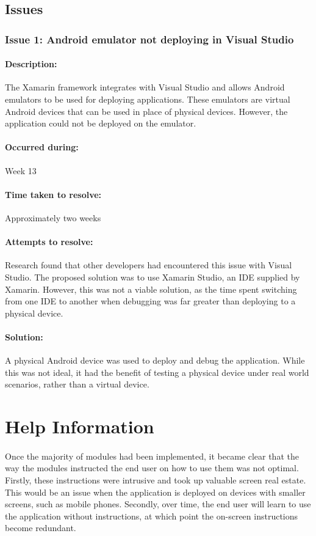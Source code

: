 	\subsection{Issues}{
		\subsubsection{Issue 1: Android emulator not deploying in Visual Studio}{
			\paragraph{Description:}
			The Xamarin framework integrates with Visual Studio and allows Android emulators to be used for deploying applications. These emulators are virtual Android devices that can be used in place of physical devices. However, the application could not be deployed on the emulator.    
			\paragraph{Occurred during:}
			Week 13
			\paragraph{Time taken to resolve:}
			Approximately two weeks
			\paragraph{Attempts to resolve:}
			Research found that other developers had encountered this issue with Visual Studio. The proposed solution was to use Xamarin Studio, an IDE supplied by Xamarin. However, this was not a viable solution, as the time spent switching from one IDE to another when debugging was far greater than deploying to a physical device. 
			\paragraph{Solution:}
			A physical Android device was used to deploy and debug the application. While this was not ideal, it had the benefit of testing a physical device under real world scenarios, rather than a virtual device.
	}
	\label{ssec:AndroidIssues}


\section{Help Information}
		\paragraph{}{
		Once the majority of modules had been implemented, it became clear that the way the modules instructed the end user on how to use them was not optimal. Firstly, these instructions were intrusive and took up valuable screen real estate. This would be an issue when the application is deployed on devices with smaller screens, such as mobile phones. Secondly, over time, the end user will learn to use the application without instructions, at which point the on-screen instructions become redundant.
		}
}
